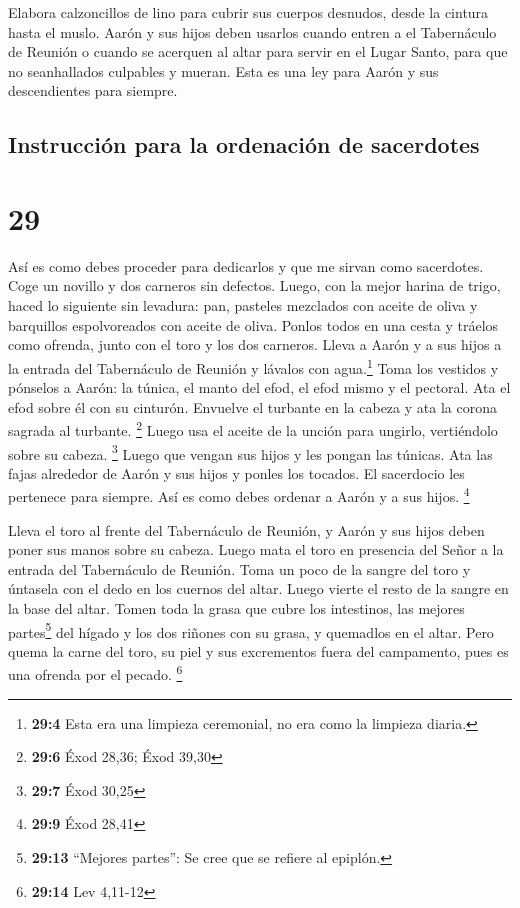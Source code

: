  Elabora calzoncillos de lino para cubrir sus cuerpos
desnudos, desde la cintura hasta el muslo.  Aarón y sus
hijos deben usarlos cuando entren a el Tabernáculo de Reunión o cuando
se acerquen al altar para servir en el Lugar Santo, para que no
seanhallados culpables y mueran. Esta es una ley para Aarón y sus
descendientes para siempre.

\hypertarget{instrucciuxf3n-para-la-ordenaciuxf3n-de-sacerdotes}{%
\subsection{Instrucción para la ordenación de
sacerdotes}\label{instrucciuxf3n-para-la-ordenaciuxf3n-de-sacerdotes}}

\hypertarget{section-28}{%
\section{29}\label{section-28}}

 Así es como debes proceder para dedicarlos y que me
sirvan como sacerdotes. Coge un novillo y dos carneros sin defectos.
 Luego, con la mejor harina de trigo, haced lo siguiente
sin levadura: pan, pasteles mezclados con aceite de oliva y barquillos
espolvoreados con aceite de oliva.  Ponlos todos en una
cesta y tráelos como ofrenda, junto con el toro y los dos carneros.
 Lleva a Aarón y a sus hijos a la entrada del Tabernáculo
de Reunión y lávalos con agua.\footnote{\textbf{29:4} Esta era una
  limpieza ceremonial, no era como la limpieza diaria.} 
Toma los vestidos y pónselos a Aarón: la túnica, el manto del efod, el
efod mismo y el pectoral. Ata el efod sobre él con su cinturón.
 Envuelve el turbante en la cabeza y ata la corona sagrada
al turbante. \footnote{\textbf{29:6} Éxod 28,36; Éxod 39,30}
 Luego usa el aceite de la unción para ungirlo,
vertiéndolo sobre su cabeza. \footnote{\textbf{29:7} Éxod 30,25}
 Luego que vengan sus hijos y les pongan las túnicas.
 Ata las fajas alrededor de Aarón y sus hijos y ponles los
tocados. El sacerdocio les pertenece para siempre. Así es como debes
ordenar a Aarón y a sus hijos. \footnote{\textbf{29:9} Éxod 28,41}

 Lleva el toro al frente del Tabernáculo de Reunión, y
Aarón y sus hijos deben poner sus manos sobre su cabeza. 
Luego mata el toro en presencia del Señor a la entrada del Tabernáculo
de Reunión.  Toma un poco de la sangre del toro y
úntasela con el dedo en los cuernos del altar. Luego vierte el resto de
la sangre en la base del altar.  Tomen toda la grasa que
cubre los intestinos, las mejores partes\footnote{\textbf{29:13}
  ``Mejores partes'': Se cree que se refiere al epiplón.} del hígado y
los dos riñones con su grasa, y quemadlos en el altar. 
Pero quema la carne del toro, su piel y sus excrementos fuera del
campamento, pues es una ofrenda por el pecado. \footnote{\textbf{29:14}
  Lev 4,11-12}

